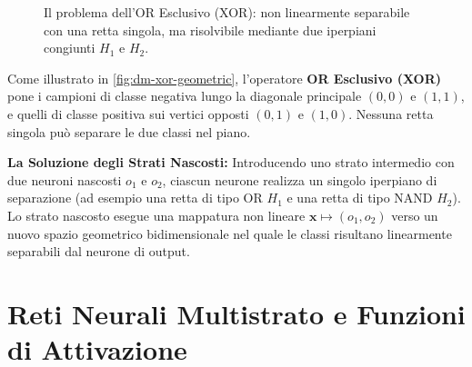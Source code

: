 \begin{figure}[H]
\centering
{}
\caption{Il problema dell'OR Esclusivo (XOR): non linearmente separabile con una retta singola, ma risolvibile mediante due iperpiani congiunti $H_1$ e $H_2$.}
\label{fig:dm-xor-geometric}
\end{figure}

Come illustrato in \autoref{fig:dm-xor-geometric}, l'operatore \textbf{OR Esclusivo (XOR)} pone i campioni di classe negativa lungo la diagonale principale $(0,0)$ e $(1,1)$, e quelli di classe positiva sui vertici opposti $(0,1)$ e $(1,0)$. Nessuna retta singola può separare le due classi nel piano.

\textbf{La Soluzione degli Strati Nascosti:} Introducendo uno strato intermedio con due neuroni nascosti $o_1$ e $o_2$, ciascun neurone realizza un singolo iperpiano di separazione (ad esempio una retta di tipo OR $H_1$ e una retta di tipo NAND $H_2$). Lo strato nascosto esegue una mappatura non lineare $\mathbf{x} \mapsto (o_1, o_2)$ verso un nuovo spazio geometrico bidimensionale nel quale le classi risultano linearmente separabili dal neurone di output.

\FloatBarrier
\section{Reti Neurali Multistrato e Funzioni di Attivazione}
\label{sec:dm-multilayer-networks}

